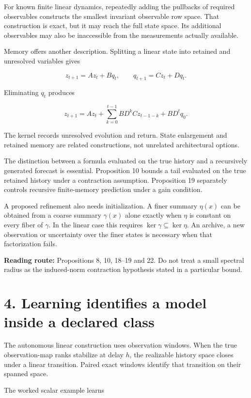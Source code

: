 \documentclass[11pt,letterpaper]{article}
\begin{document}
For known finite linear dynamics, repeatedly adding the pullbacks of
required observables constructs the smallest invariant observable row
space. That construction is exact, but it may reach the full state
space. Its additional observables may also be inaccessible from the
measurements actually available.

Memory offers another description. Splitting a linear state into
retained and unresolved variables gives

\[
z_{t+1}=Az_t+Bq_t,\qquad q_{t+1}=Cz_t+Dq_t.
\]

Eliminating \(q_t\) produces

\[
z_{t+1}=Az_t+\sum_{k=0}^{t-1}BD^kCz_{t-1-k}+BD^tq_0.
\]

The kernel records unresolved evolution and return. State enlargement
and retained memory are related constructions, not unrelated
architectural options.

The distinction between a formula evaluated on the true history and a
recursively generated forecast is essential. Proposition 10 bounds a
tail evaluated on the true retained history under a contraction
assumption. Proposition 19 separately controls recursive finite-memory
prediction under a gain condition.

A proposed refinement also needs initialization. A finer summary
\(\eta(x)\) can be obtained from a coarse summary \(\gamma(x)\) alone
exactly when \(\eta\) is constant on every fiber of \(\gamma\). In the
linear case this requires \(\ker\gamma\subseteq\ker\eta\). An archive, a
new observation or uncertainty over the finer states is necessary when
that factorization fails.

\textbf{Reading route:} Propositions 8, 10, 18--19 and 22. Do not treat
a small spectral radius as the induced-norm contraction hypothesis
stated in a particular bound.

\section{4. Learning identifies a model inside a declared
class}\label{learning-identifies-a-model-inside-a-declared-class}

The autonomous linear construction uses observation windows. When the
true observation-map ranks stabilize at delay \(h\), the realizable
history space closes under a linear transition. Paired exact windows
identify that transition on their spanned space.

The worked scalar example learns
\end{document}
